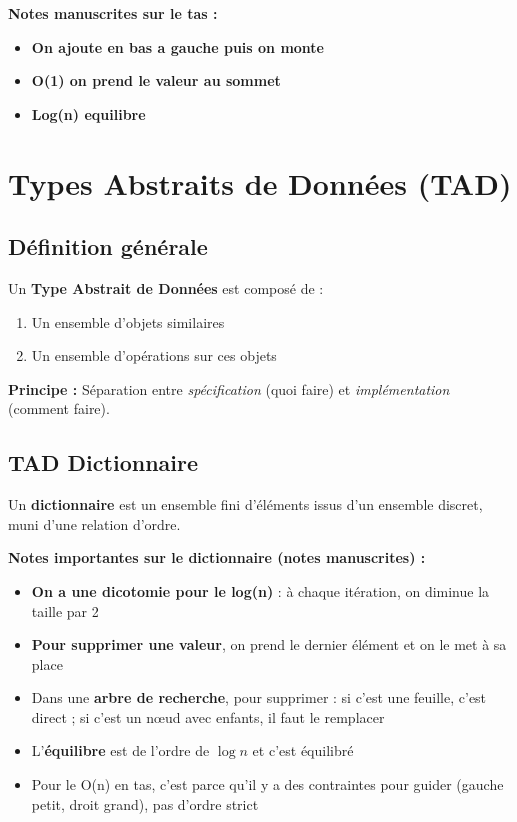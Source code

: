 \documentclass[12pt,a4paper]{article}
\begin{document}
\begin{notecours}
\textbf{Notes manuscrites sur le tas :}
\begin{itemize}
    \item \textbf{On ajoute en bas a gauche puis on monte}
    \item \textbf{O(1) on prend le valeur au sommet}
    \item \textbf{Log(n) equilibre}
\end{itemize}
\end{notecours}

\newpage
\section{Types Abstraits de Données (TAD)}

\subsection{Définition générale}

\begin{definition}
Un \textbf{Type Abstrait de Données} est composé de :
\begin{enumerate}
    \item Un ensemble d'objets similaires
    \item Un ensemble d'opérations sur ces objets
\end{enumerate}

\textbf{Principe :} Séparation entre \textit{spécification} (quoi faire) et \textit{implémentation} (comment faire).
\end{definition}

\subsection{TAD Dictionnaire}

\begin{definition}
Un \textbf{dictionnaire} est un ensemble fini d'éléments issus d'un ensemble discret, muni d'une relation d'ordre.
\end{definition}

\begin{notecours}
\textbf{Notes importantes sur le dictionnaire (notes manuscrites) :}
\begin{itemize}
    \item \textbf{On a une dicotomie pour le log(n)} : à chaque itération, on diminue la taille par 2
    \item \textbf{Pour supprimer une valeur}, on prend le dernier élément et on le met à sa place
    \item Dans une \textbf{arbre de recherche}, pour supprimer : si c'est une feuille, c'est direct ; si c'est un nœud avec enfants, il faut le remplacer
    \item L'\textbf{équilibre} est de l'ordre de $\log n$ et c'est équilibré
    \item Pour le O(n) en tas, c'est parce qu'il y a des contraintes pour guider (gauche petit, droit grand), pas d'ordre strict
\end{itemize}
\end{notecours}
\end{document}
